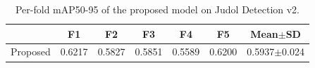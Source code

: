 \begin{table}[t]
\centering
\caption{Per-fold mAP50-95 of the proposed model on Judol Detection v2.}
\label{tab:perfold}
\begin{tabular}{@{}lcccccc@{}}
\toprule
& F1 & F2 & F3 & F4 & F5 & Mean$\pm$SD \\
\midrule
Proposed & 0.6217 & 0.5827 & 0.5851 & 0.5589 & 0.6200 & 0.5937$\pm$0.024 \\
\bottomrule
\end{tabular}
\end{table}

